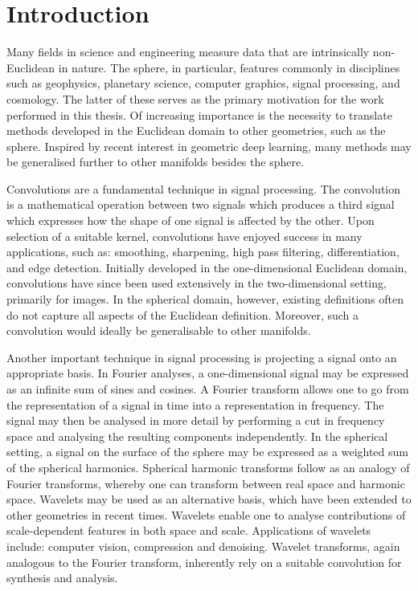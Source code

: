 \chapter{Introduction}\label{sec:chapter1}

Many fields in science and engineering measure data that are intrinsically non-Euclidean in nature.
The sphere, in particular, features commonly in disciplines such as geophysics, planetary science, computer graphics, signal processing, and cosmology.
The latter of these serves as the primary motivation for the work performed in this thesis.
Of increasing importance is the necessity to translate methods developed in the Euclidean domain to other geometries, such as the sphere.
Inspired by recent interest in geometric deep learning, many methods may be generalised further to other manifolds besides the sphere.

Convolutions are a fundamental technique in signal processing.
The convolution is a mathematical operation between two signals which produces a third signal which expresses how the shape of one signal is affected by the other.
Upon selection of a suitable kernel, convolutions have enjoyed success in many applications, such as: smoothing, sharpening, high pass filtering, differentiation, and edge detection.
Initially developed in the one-dimensional Euclidean domain, convolutions have since been used extensively in the two-dimensional setting, primarily for images.
In the spherical domain, however, existing definitions often do not capture all aspects of the Euclidean definition.
Moreover, such a convolution would ideally be generalisable to other manifolds.

Another important technique in signal processing is projecting a signal onto an appropriate basis.
In Fourier analyses, a one-dimensional signal may be expressed as an infinite sum of sines and cosines.
A Fourier transform allows one to go from the representation of a signal in time into a representation in frequency.
The signal may then be analysed in more detail by performing a cut in frequency space and analysing the resulting components independently.
In the spherical setting, a signal on the surface of the sphere may be expressed as a weighted sum of the spherical harmonics.
Spherical harmonic transforms follow as an analogy of Fourier transforms, whereby one can transform between real space and harmonic space.
Wavelets may be used as an alternative basis, which have been extended to other geometries in recent times.
Wavelets enable one to analyse contributions of scale-dependent features in both space and scale.
Applications of wavelets include: computer vision, compression and denoising.
Wavelet transforms, again analogous to the Fourier transform, inherently rely on a suitable convolution for synthesis and analysis.


